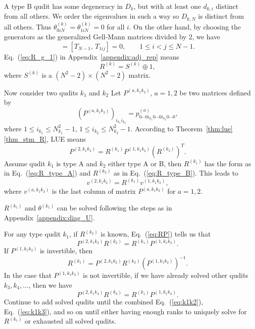 \documentclass{article}
\begin{document}
A type B qudit has some degeneracy in $D_k$,
but with at least one $d_{k,i}$ distinct from all others.
We order the eigenvalues in such a way so $D_{k,N}$ is distinct from
all others.  Thus $\theta^{(k)}_{0iN} = \theta^{(k)}_{1iN} = 0$ for all $i$.
On the other hand, by choosing the generators as the generalized Gell-Mann
matrices divided by 2, we have
\begin{equation}
  [T_{N-1},\, T_{0ij}] = [T_{N-1},\, T_{1ij}] = 0,\qquad 1\le i < j \le N-1.
\end{equation}
Eq.~(\ref{eq:R_g_1}) in Appendix~\ref{appendix:adj_rep} means
\begin{equation}
  \label{eq:R_type_B}
  R^{(k)} = S^{(k)}\oplus1,
\end{equation}
where $S^{(k)}$ is a $(N^2-2)\times(N^2-2)$ matrix.

Now consider two qudits $k_1$ and $k_2$
Let $P^{(a,k_1k_2)}$, $a = 1, 2$ be two matrices defined by
\begin{equation}
  \left(P^{(a,k_1k_2)}\right)_{i_{k_1}i_{k_2}} = p^{(a)}_{0\cdots0i_{k_1}0\cdots0i_{k_2}0\cdots0},
\end{equation}
where $1 \le i_{k_1} \le N_{k_1}^2-1$, $1 \le i_{k_2} \le N_{k_2}^2-1$.
According to Theorem~\ref{thm:lue} \ref{thm_stm_R}, LUE means
\begin{equation}
  \label{eq:RP}
  P^{(2,k_1k_2)} = R^{(k_1)}P^{(1,k_1k_2)}(R^{(k_2)})^T.
\end{equation}
Assume qudit $k_1$ is type A and $k_2$ either type A or B, then
$R^{(k_1)}$ has the form as in Eq.~(\ref{eq:R_type_A}) and
$R^{(k_2)}$ as in Eq.~(\ref{eq:R_type_B}).  This leads to
\begin{equation}
  \label{eq:vRv}
  v^{(2,k_1k_2)} =  R^{(k_1)}v^{(1,k_1k_2)},
\end{equation}
where $v^{(a,k_1k_2)}$ is the last column of matrix $P^{(a,k_1k_2)}$
for $a = 1, 2$.

$R^{(k_1)}$ and $\theta^{(k_1)}$ can be solved following the steps as in
Appendix~\ref{appendix:diag_U}.

For any type qudit $k_1$, if $R^{(k_2)}$ is known, Eq.~(\ref{eq:RP})
tells us that
\begin{equation}
  \label{eq:k1k2}
  P^{(2,k_1k_2)}R^{(k_2)} = R^{(k_1)}P^{(1,k_1k_2)}.
\end{equation}
If $P^{(1,k_1k_2)}$ is invertible, then
\begin{equation}
  R^{(k_1)} = P^{(2,k_1k_2)}R^{(k_2)}(P^{(1,k_1k_2)})^{-1}.
\end{equation}
In the case that $P^{(1,k_1k_2)}$ is not invertible, if we have already solved
other qudits $k_3, k_4, \ldots$, then we have
\begin{equation}
  \label{eq:k1k3}
  P^{(2,k_1k_3)}R^{(k_3)} = R^{(k_1)}P^{(1,k_1k_3)}.
\end{equation}
Continue to add solved qudits until the combined Eq.~(\ref{eq:k1k2}),
Eq.~(\ref{eq:k1k3}), and so on until either having enough ranks to
uniquely solve for $R^{(k_1)}$ or exhausted all solved qudits.
\end{document}
